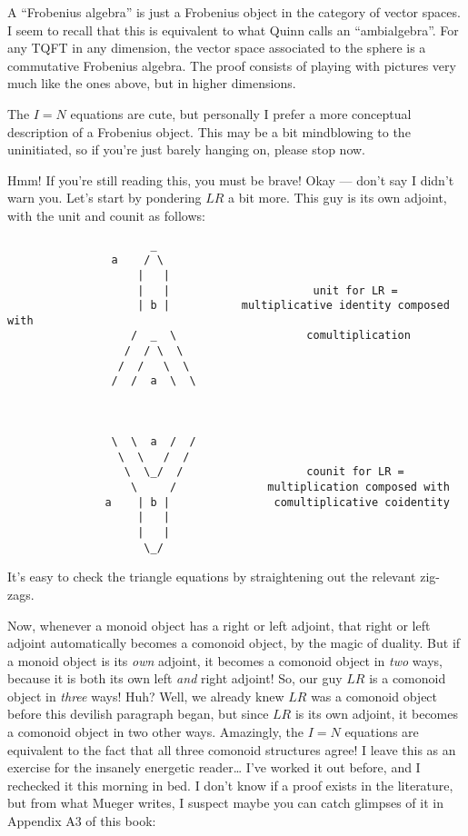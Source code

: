 \documentclass{article}
\begin{document}
A ``Frobenius algebra'' is just a Frobenius object in the category of
vector spaces. I seem to recall that this is equivalent to what Quinn
calls an ``ambialgebra''. For any TQFT in any dimension, the vector
space associated to the sphere is a commutative Frobenius algebra. The
proof consists of playing with pictures very much like the ones above,
but in higher dimensions.

The \(I = N\) equations are cute, but personally I prefer a more
conceptual description of a Frobenius object. This may be a bit
mindblowing to the uninitiated, so if you're just barely hanging on,
please stop now.

Hmm! If you're still reading this, you must be brave! Okay --- don't say
I didn't warn you. Let's start by pondering \(LR\) a bit more. This guy
is its own adjoint, with the unit and counit as follows:

\begin{verbatim}
                      _
                a    / \      
                    |   |                     
                    |   |                      unit for LR =
                    | b |           multiplicative identity composed with
                   /  _  \                    comultiplication                
                  /  / \  \
                 /  /   \  \
                /  /  a  \  \



                \  \  a  /  /
                 \  \   /  /                 
                  \  \_/  /                   counit for LR =
                   \     /              multiplication composed with 
               a    | b |                comultiplicative coidentity
                    |   |
                    |   |
                     \_/
\end{verbatim}

It's easy to check the triangle equations by straightening out the
relevant zig-zags.

Now, whenever a monoid object has a right or left adjoint, that right or
left adjoint automatically becomes a comonoid object, by the magic of
duality. But if a monoid object is its \emph{own} adjoint, it becomes a
comonoid object in \emph{two} ways, because it is both its own left
\emph{and} right adjoint! So, our guy \(LR\) is a comonoid object in
\emph{three} ways! Huh? Well, we already knew \(LR\) was a comonoid
object before this devilish paragraph began, but since \(LR\) is its own
adjoint, it becomes a comonoid object in two other ways. Amazingly, the
\(I = N\) equations are equivalent to the fact that all three comonoid
structures agree! I leave this as an exercise for the insanely energetic
reader\ldots{} I've worked it out before, and I rechecked it this
morning in bed. I don't know if a proof exists in the literature, but
from what Mueger writes, I suspect maybe you can catch glimpses of it in
Appendix A3 of this book:
\end{document}
